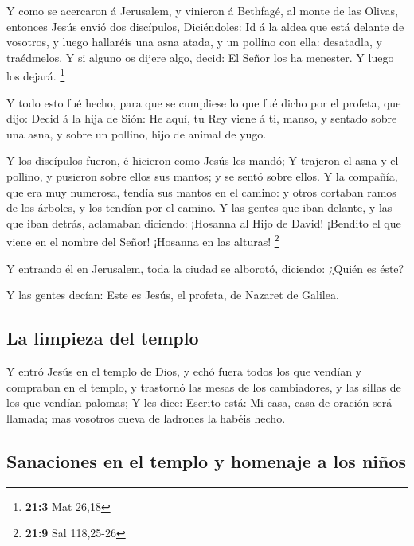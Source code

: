  Y como se acercaron á Jerusalem, y vinieron á Bethfagé,
al monte de las Olivas, entonces Jesús envió dos discípulos,
 Diciéndoles: Id á la aldea que está delante de vosotros,
y luego hallaréis una asna atada, y un pollino con ella: desatadla, y
traédmelos.  Y si alguno os dijere algo, decid: El Señor
los ha menester. Y luego los dejará. \footnote{\textbf{21:3} Mat 26,18}

 Y todo esto fué hecho, para que se cumpliese lo que fué
dicho por el profeta, que dijo:  Decid á la hija de Sión:
He aquí, tu Rey viene á ti, manso, y sentado sobre una asna, y sobre un
pollino, hijo de animal de yugo.

 Y los discípulos fueron, é hicieron como Jesús les mandó;
 Y trajeron el asna y el pollino, y pusieron sobre ellos
sus mantos; y se sentó sobre ellos.  Y la compañía, que
era muy numerosa, tendía sus mantos en el camino: y otros cortaban ramos
de los árboles, y los tendían por el camino.  Y las gentes
que iban delante, y las que iban detrás, aclamaban diciendo: ¡Hosanna al
Hijo de David! ¡Bendito el que viene en el nombre del Señor! ¡Hosanna en
las alturas! \footnote{\textbf{21:9} Sal 118,25-26}

 Y entrando él en Jerusalem, toda la ciudad se alborotó,
diciendo: ¿Quién es éste?

 Y las gentes decían: Este es Jesús, el profeta, de
Nazaret de Galilea.

\hypertarget{la-limpieza-del-templo}{%
\subsection{La limpieza del templo}\label{la-limpieza-del-templo}}

 Y entró Jesús en el templo de Dios, y echó fuera todos
los que vendían y compraban en el templo, y trastornó las mesas de los
cambiadores, y las sillas de los que vendían palomas;  Y
les dice: Escrito está: Mi casa, casa de oración será llamada; mas
vosotros cueva de ladrones la habéis hecho.

\hypertarget{sanaciones-en-el-templo-y-homenaje-a-los-niuxf1os}{%
\subsection{Sanaciones en el templo y homenaje a los
niños}\label{sanaciones-en-el-templo-y-homenaje-a-los-niuxf1os}}

